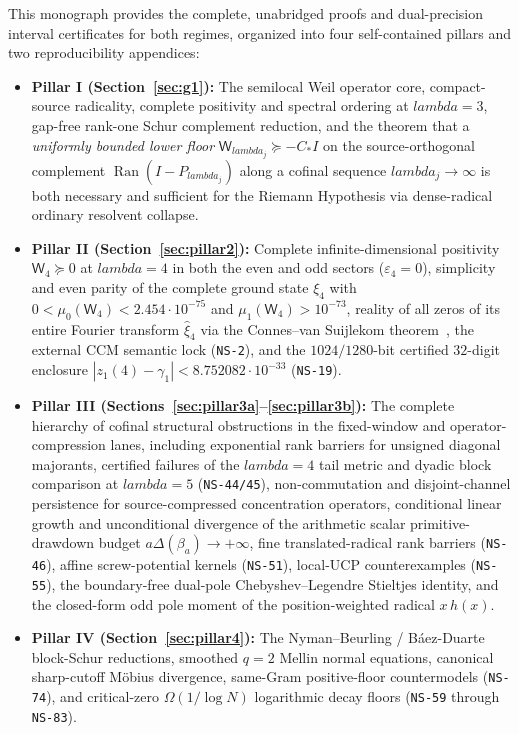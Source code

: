 \documentclass[11pt]{article}
\def\lambda{lambda}%
\theoremstyle{remark}
\begin{document}
This monograph provides the complete, unabridged proofs and dual-precision interval certificates for both regimes, organized into four self-contained pillars and two reproducibility appendices:
\begin{itemize}
\item \textbf{Pillar I (Section~\ref{sec:g1}):} The semilocal Weil operator core, compact-source radicality, complete positivity and spectral ordering at $\lambda=3$, gap-free rank-one Schur complement reduction, and the theorem that a \emph{uniformly bounded lower floor} $\mathsf W_{\lambda_j}\succeq -C_* I$ on the source-orthogonal complement $\operatorname{Ran}(I-P_{\lambda_j})$ along a cofinal sequence $\lambda_j\to\infty$ is both necessary and sufficient for the Riemann Hypothesis via dense-radical ordinary resolvent collapse.
\item \textbf{Pillar II (Section~\ref{sec:pillar2}):} Complete infinite-dimensional positivity $\mathsf W_4\succeq 0$ at $\lambda=4$ in both the even and odd sectors ($\varepsilon_4=0$), simplicity and even parity of the complete ground state $\xi_4$ with $0<\mu_0(\mathsf W_4)<2.454\cdot 10^{-75}$ and $\mu_1(\mathsf W_4)>10^{-73}$, reality of all zeros of its entire Fourier transform $\widehat{\xi}_4$ via the Connes--van Suijlekom theorem~\cite{ConnesVanSuijlekom2025}, the external CCM semantic lock (\texttt{NS-2}), and the $1024/1280$-bit certified $32$-digit enclosure $|z_1(4)-\gamma_1|<8.752082\cdot 10^{-33}$ (\texttt{NS-19}).
\item \textbf{Pillar III (Sections~\ref{sec:pillar3a}--\ref{sec:pillar3b}):} The complete hierarchy of cofinal structural obstructions in the fixed-window and operator-compression lanes, including exponential rank barriers for unsigned diagonal majorants, certified failures of the $\lambda=4$ tail metric and dyadic block comparison at $\lambda=5$ (\texttt{NS-44/45}), non-commutation and disjoint-channel persistence for source-compressed concentration operators, conditional linear growth and unconditional divergence of the arithmetic scalar primitive-drawdown budget $a\Delta(\beta_a)\to+\infty$, fine translated-radical rank barriers (\texttt{NS-46}), affine screw-potential kernels (\texttt{NS-51}), local-UCP counterexamples (\texttt{NS-55}), the boundary-free dual-pole Chebyshev--Legendre Stieltjes identity, and the closed-form odd pole moment of the position-weighted radical $x\,h(x)$.
\item \textbf{Pillar IV (Section~\ref{sec:pillar4}):} The Nyman--Beurling / B\'aez-Duarte block-Schur reductions, smoothed $q=2$ Mellin normal equations, canonical sharp-cutoff M\"obius divergence, same-Gram positive-floor countermodels (\texttt{NS-74}), and critical-zero $\Omega(1/\log N)$ logarithmic decay floors (\texttt{NS-59} through \texttt{NS-83}).
\end{itemize}
\end{document}
